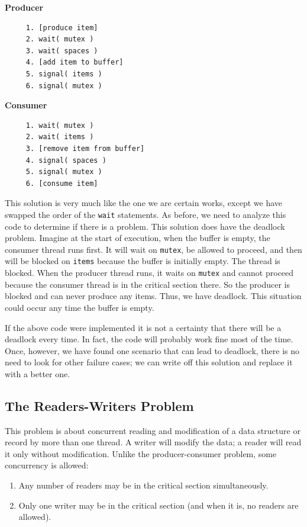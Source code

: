 \begin{multicols}{2}
\textbf{Producer}\vspace{-2em}
  \begin{verbatim}
	 1. [produce item]
	 2. wait( mutex )
	 3. wait( spaces )
	 4. [add item to buffer]
	 5. signal( items )
	 6. signal( mutex )
  \end{verbatim}
\columnbreak
\textbf{Consumer}\vspace{-2em}
  \begin{verbatim}
	 1. wait( mutex )
	 2. wait( items )
	 3. [remove item from buffer]
	 4. signal( spaces )
	 5. signal( mutex )
	 6. [consume item]
  \end{verbatim}
\end{multicols}
\vspace{-2em}

This solution is very much like the one we are certain works, except we have swapped the order of the \texttt{wait} statements. As before, we need to analyze this code to determine if there is a problem. This solution does have the deadlock problem. Imagine at the start of execution, when the buffer is empty, the consumer thread runs first. It will wait on \texttt{mutex}, be allowed to proceed, and then will be blocked on \texttt{items} because the buffer is initially empty. The thread is blocked. When the producer thread runs, it waits on \texttt{mutex} and cannot proceed because the consumer thread is in the critical section there. So the producer is blocked and can never produce any items. Thus, we have deadlock. This situation could occur any time the buffer is empty.

If the above code were implemented it is not a certainty that there will be a deadlock every time. In fact, the code will probably work fine most of the time. Once, however, we have found one scenario that can lead to deadlock, there is no need to look for other failure cases; we can write off this solution and replace it with a better one.

\subsection*{The Readers-Writers Problem}
This problem is about concurrent reading and modification of a data structure or record by more than one thread. A writer will modify the data; a reader will read it only without modification. Unlike the producer-consumer problem, some concurrency is allowed:

\begin{enumerate}
\item Any number of readers may be in the critical section simultaneously.
\item Only one writer may be in the critical section (and when it is, no readers are allowed).
\end{enumerate}

